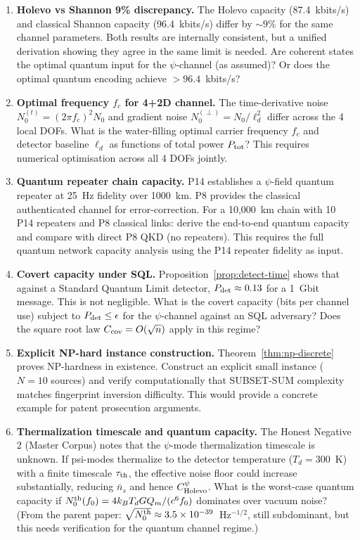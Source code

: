 \documentclass[aps,prd,twocolumn,superscriptaddress,nofootinbib]{revtex4-2}
\begin{document}
\begin{enumerate}

\item \textbf{Holevo vs Shannon 9\% discrepancy.} The Holevo capacity
(87.4~kbits/s) and classical Shannon capacity (96.4~kbits/s) differ by
$\sim 9\%$ for the same channel parameters. Both results are internally
consistent, but a unified derivation showing they agree in the same limit
is needed. Are coherent states the optimal quantum input for the $\psi$-channel
(as assumed)? Or does the optimal quantum encoding achieve $>96.4$~kbits/s?

\item \textbf{Optimal frequency $f_c$ for 4+2D channel.}
The time-derivative noise $N_0^{(t)} = (2\pi f_c)^2 N_0$ and gradient
noise $N_0^{(\perp)} = N_0/\ell_d^2$ differ across the 4 local DOFs.
What is the water-filling optimal carrier frequency $f_c$ and detector
baseline $\ell_d$ as functions of total power $P_{\rm tot}$? This requires
numerical optimisation across all 4 DOFs jointly.

\item \textbf{Quantum repeater chain capacity.}
P14 establishes a $\psi$-field quantum repeater at 25~Hz fidelity over
1000~km. P8 provides the classical authenticated channel for error-correction.
For a 10,000~km chain with 10 P14 repeaters and P8 classical links:
derive the end-to-end quantum capacity and compare with direct P8 QKD
(no repeaters). This requires the full quantum network capacity analysis
using the P14 repeater fidelity as input.

\item \textbf{Covert capacity under SQL.}
Proposition~\ref{prop:detect-time} shows that against a Standard Quantum
Limit detector, $P_{\rm det} \approx 0.13$ for a 1~Gbit message.
This is not negligible. What is the covert capacity (bits per channel use)
subject to $P_{\rm det} \leq \epsilon$ for the $\psi$-channel against an
SQL adversary? Does the square root law $C_{\rm cov} = O(\sqrt{n})$
apply in this regime?

\item \textbf{Explicit NP-hard instance construction.}
Theorem~\ref{thm:np-discrete} proves NP-hardness in existence. Construct
an explicit small instance ($N = 10$ sources) and verify computationally
that SUBSET-SUM complexity matches fingerprint inversion difficulty.
This would provide a concrete example for patent prosecution arguments.

\item \textbf{Thermalization timescale and quantum capacity.}
The Honest Negative 2 (Master Corpus) notes that the $\psi$-mode
thermalization timescale is unknown. If psi-modes thermalize to the
detector temperature ($T_d = 300$~K) with a finite timescale
$\tau_{\rm th}$, the effective noise floor could increase substantially,
reducing $\bar{n}_s$ and hence $C_{\rm Holevo}^\psi$. What is the
worst-case quantum capacity if $N_0^{\rm th}(f_0) = 4k_B T_d G Q_m / (c^6 f_0)$
dominates over vacuum noise? (From the parent paper: $\sqrt{N_0^{\rm th}} \approx 3.5\times 10^{-39}$~Hz$^{-1/2}$,
still subdominant, but this needs verification for the quantum channel regime.)

\end{enumerate}
\end{document}
